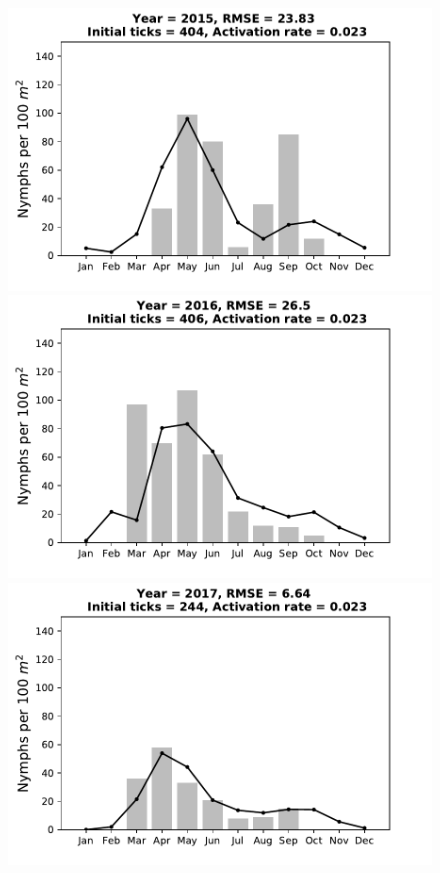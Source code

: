 \documentclass[a4paper, 11pt]{scrartcl}
\begin{document}
\begin{figure}[h!]
\begin{minipage}[c]{0.40\linewidth}
\end{minipage}
\begin{minipage}[c]{0.40\linewidth}
\includegraphics[width=\linewidth]{figures/s1/S1_2015}
\end{minipage}
\begin{minipage}[c]{0.40\linewidth}
\includegraphics[width=\linewidth]{figures/s1/S1_2016}
\end{minipage}
\begin{minipage}[c]{0.40\linewidth}
\includegraphics[width=\linewidth]{figures/s1/S1_2017}

\end{minipage}
\end{figure}
\end{document}
